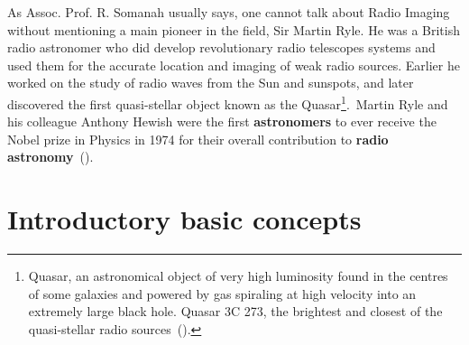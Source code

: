 As Assoc. Prof. R. Somanah usually says, one cannot talk about Radio Imaging without mentioning a main pioneer in the field, Sir Martin Ryle. He was a British radio astronomer who did develop revolutionary radio telescopes systems and used them for the accurate location and imaging of weak radio sources. Earlier he worked on the study of radio waves from the Sun and sunspots, and later discovered the first quasi-stellar object known as the Quasar\footnote{Quasar, an astronomical object of very high luminosity found in the centres of some galaxies and powered by gas spiraling at high velocity into an extremely large black hole.{ Quasar 3C 273, the brightest and closest of the quasi-stellar radio sources~(\citet{britannica.Quasar})}.}.~Martin Ryle and his colleague Anthony Hewish were the first \textbf{astronomers} to ever receive the Nobel prize in Physics in 1974 for their overall contribution to \textbf{radio astronomy}~(\citet{britannica.Martin}). 


\section{Introductory basic concepts}
